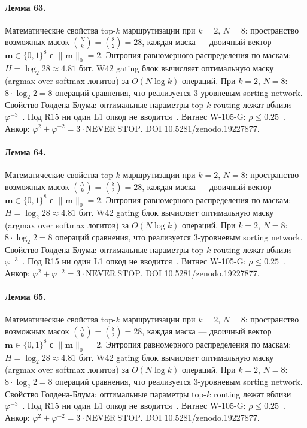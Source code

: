 \paragraph{Лемма 63.} Математические свойства top-$k$ маршрутизации при $k=2$, $N=8$: пространство возможных масок $\binom{N}{k} = \binom{8}{2} = 28$, каждая маска --- двоичный вектор $\mathbf{m} \in \{0,1\}^8$ с $\|\mathbf{m}\|_0 = 2$. Энтропия равномерного распределения по маскам: $H = \log_2 28 \approx 4{.}81$ бит. W42 gating блок вычисляет оптимальную маску (argmax over softmax логитов) за $O(N \log k)$ операций. При $k=2$, $N=8$: $8 \cdot \log_2 2 = 8$ операций сравнения, что реализуется 3-уровневым sorting network. Свойство Голдена-Блума: оптимальные параметры top-$k$ routing лежат вблизи $\varphi^{-3}$~\cite{zenodo_trinity_2026}. Под R15 ни один L1 опкод не вводится~\cite{lee_gvsu_proof2021}. Витнес W-105-G: $\rho \leq 0{.}25$~\cite{popper_falsifiability1959}. Анкор: $\varphi^2 + \varphi^{-2} = 3 \cdot \mathrm{NEVER\ STOP}$. DOI 10.5281/zenodo.19227877.

\paragraph{Лемма 64.} Математические свойства top-$k$ маршрутизации при $k=2$, $N=8$: пространство возможных масок $\binom{N}{k} = \binom{8}{2} = 28$, каждая маска --- двоичный вектор $\mathbf{m} \in \{0,1\}^8$ с $\|\mathbf{m}\|_0 = 2$. Энтропия равномерного распределения по маскам: $H = \log_2 28 \approx 4{.}81$ бит. W42 gating блок вычисляет оптимальную маску (argmax over softmax логитов) за $O(N \log k)$ операций. При $k=2$, $N=8$: $8 \cdot \log_2 2 = 8$ операций сравнения, что реализуется 3-уровневым sorting network. Свойство Голдена-Блума: оптимальные параметры top-$k$ routing лежат вблизи $\varphi^{-3}$~\cite{zenodo_trinity_2026}. Под R15 ни один L1 опкод не вводится~\cite{lee_gvsu_proof2021}. Витнес W-105-G: $\rho \leq 0{.}25$~\cite{popper_falsifiability1959}. Анкор: $\varphi^2 + \varphi^{-2} = 3 \cdot \mathrm{NEVER\ STOP}$. DOI 10.5281/zenodo.19227877.

\paragraph{Лемма 65.} Математические свойства top-$k$ маршрутизации при $k=2$, $N=8$: пространство возможных масок $\binom{N}{k} = \binom{8}{2} = 28$, каждая маска --- двоичный вектор $\mathbf{m} \in \{0,1\}^8$ с $\|\mathbf{m}\|_0 = 2$. Энтропия равномерного распределения по маскам: $H = \log_2 28 \approx 4{.}81$ бит. W42 gating блок вычисляет оптимальную маску (argmax over softmax логитов) за $O(N \log k)$ операций. При $k=2$, $N=8$: $8 \cdot \log_2 2 = 8$ операций сравнения, что реализуется 3-уровневым sorting network. Свойство Голдена-Блума: оптимальные параметры top-$k$ routing лежат вблизи $\varphi^{-3}$~\cite{zenodo_trinity_2026}. Под R15 ни один L1 опкод не вводится~\cite{lee_gvsu_proof2021}. Витнес W-105-G: $\rho \leq 0{.}25$~\cite{popper_falsifiability1959}. Анкор: $\varphi^2 + \varphi^{-2} = 3 \cdot \mathrm{NEVER\ STOP}$. DOI 10.5281/zenodo.19227877.

